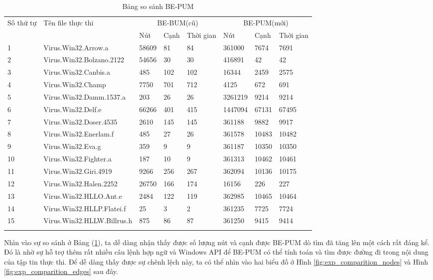\newpage
\begin{small}
\setlength\tabcolsep{7pt}
\centering
	\begin{longtable}{| l | l | l | l | l | l | l | l |}
\hline
	Số thứ tự &  Tên file thực thi  & \multicolumn{3}{c|}{BE-BUM(cũ)} & \multicolumn{3}{c|}{BE-PUM(mới)} \\
	\cline{3-8}
	& & Nút & Cạnh & Thời gian & Nút & Cạnh & Thời gian \\
	  \hline
       \hline
       		1 & Virus.Win32.Arrow.a &58609	&81	&84&	361000&	7674	& 7691 \\		
		\hline
			2 &Virus.Win32.Bolzano.2122 &	54656	&30&	30	&416891&	42&	42		\\	
		\hline	
			3	&Virus.Win32.Canbis.a	&485	&102&	102	&16344&	2459	&2575 \\
		\hline
			4	&Virus.Win32.Champ	&7750	&701	&712&	4125&	672	&691\\
		\hline
			5 &Virus.Win32.Damm.1537.a	&203&	26&	26	&3261219&	9214&	9214\\
		\hline		
			6	&Virus.Win32.Delf.e	&66266&	401&	415&	1447094&	67131	& 67495\\
		\hline
			7	&Virus.Win32.Doser.4535&	2610&	145	&145&	361188&	9882	 &9917\\
		\hline
			8	&Virus.Win32.Enerlam.f	&485&	27&	26&	361578&	10483	&10482\\
		\hline
			 9 & Virus.Win32.Eva.g	&359	&9	&9	&361187	&10350	&10350\\
		\hline
			10	&Virus.Win32.Fighter.a	&187&	10	&9&	361313&	10462	&10461\\
		\hline
			11	&Virus.Win32.Giri.4919&	9266&	256	&267&	362094&	10136&	10175\\
		\hline
			12	&Virus.Win32.Halen.2252	&26750	&166&	174&	16156	&226&	227\\
		\hline
			13	&Virus.Win32.HLLO.Ant.e&	2484	&122&	119	&362985&	10465&	10464\\
		\hline
			14	&Virus.Win32.HLLP.Flatei.f	&25	&3	&2	&361235	&7725	&7724\\
		\hline
			15 &	Virus.Win32.HLLW.Billrus.h &	875&	86&	87	&361250&	9415&	9414\\
        
        \hline                  
        	\caption{Bảng so sánh BE-PUM}
        	\label{tb:SoSanhBEPUM}          
       \end{longtable}	
	\end{small}
	
	Nhìn vào sự so sánh ở Bảng (\ref{tb:SoSanhBEPUM}), ta dễ dàng nhận thấy được số lượng nút và cạnh được BE-PUM dò tìm đã tăng lên một cách rất đáng kể. Đó là nhờ sự hỗ trợ thêm rất nhiều câu lệnh hợp ngữ và Windows API để BE-PUM có thể tính toán và tìm được đường đi trong nội dung của tập tin thực thi. Để dễ dàng thấy được sự chênh lệch này, ta có thể nhìn vào hai biểu đồ ở Hình \ref{fig:exp_comparition_nodes} và Hình \ref{fig:exp_comparition_edges} sau đây.

